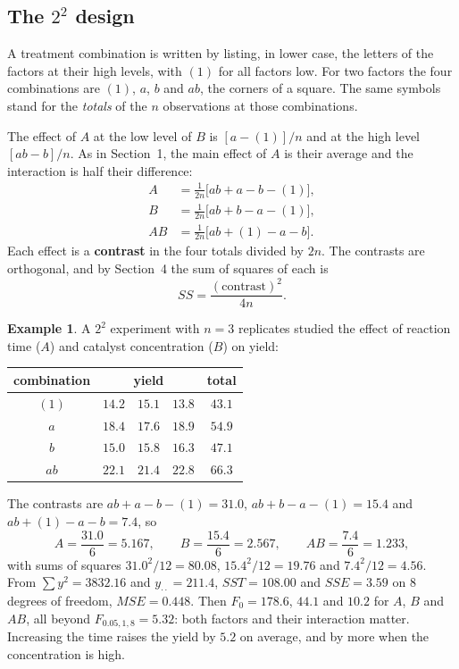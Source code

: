 \documentclass[11pt,a4paper]{article}
\numberwithin{equation}{section}
\theoremstyle{definition}
\newtheorem{exa}[thm]{Example}
\begin{document}
\subsection{The $2^2$ design}
A treatment combination is written by listing, in lower case, the letters of the factors at their high levels, with $(1)$ for all factors low. For two
factors the four combinations are $(1)$, $a$, $b$ and $ab$, the corners of a square. The same symbols stand for the \emph{totals} of the $n$ observations at
those combinations.

The effect of $A$ at the low level of $B$ is $[a - (1)]/n$ and at the high level $[ab - b]/n$. As in Section~1, the main effect of $A$ is their average and the
interaction is half their difference:
\begin{align*}
A &= \frac{1}{2n}\bigl[ab + a - b - (1)\bigr] , \\
B &= \frac{1}{2n}\bigl[ab + b - a - (1)\bigr] , \\
AB &= \frac{1}{2n}\bigl[ab + (1) - a - b\bigr] .
\end{align*}
Each effect is a \textbf{contrast} in the four totals divided by $2n$. The contrasts are orthogonal, and by Section~4 the sum of squares of each is
\[
SS = \frac{(\text{contrast})^2}{4n} .
\]

\begin{exa}\label{exa:twosquared}
A $2^2$ experiment with $n = 3$ replicates studied the effect of reaction time ($A$) and catalyst concentration ($B$) on yield:
\begin{center}
\begin{tabular}{c|ccc|c}
combination & \multicolumn{3}{c|}{yield} & total \\
\hline
$(1)$ & $14.2$ & $15.1$ & $13.8$ & $43.1$ \\
$a$ & $18.4$ & $17.6$ & $18.9$ & $54.9$ \\
$b$ & $15.0$ & $15.8$ & $16.3$ & $47.1$ \\
$ab$ & $22.1$ & $21.4$ & $22.8$ & $66.3$
\end{tabular}
\end{center}
The contrasts are $ab + a - b - (1) = 31.0$, $ab + b - a - (1) = 15.4$ and $ab + (1) - a - b = 7.4$, so
\[
A = \frac{31.0}{6} = 5.167 , \qquad B = \frac{15.4}{6} = 2.567 , \qquad AB = \frac{7.4}{6} = 1.233 ,
\]
with sums of squares $31.0^2/12 = 80.08$, $15.4^2/12 = 19.76$ and $7.4^2/12 = 4.56$. From $\sum y^2 = 3832.16$ and $y_{\cdot\cdot} = 211.4$, $SST = 108.00$ and $SSE = 3.59$ on
$8$ degrees of freedom, $MSE = 0.448$. Then $F_0 = 178.6$, $44.1$ and $10.2$ for $A$, $B$ and $AB$, all beyond $F_{0.05,1,8} = 5.32$: both factors and their interaction
matter. Increasing the time raises the yield by $5.2$ on average, and by more when the concentration is high.
\end{exa}
\end{document}
